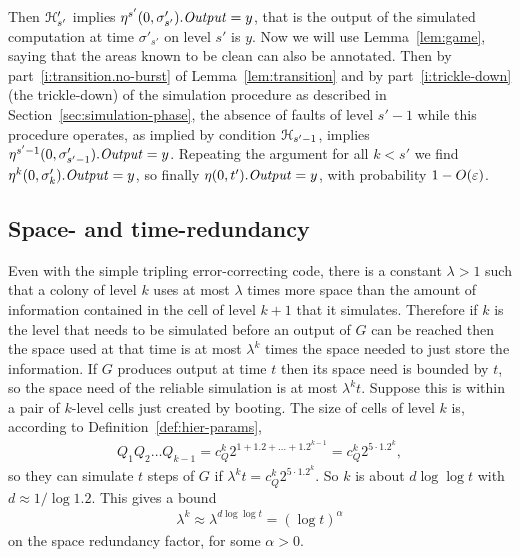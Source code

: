 \documentclass[11pt]{memoir}
\theoremstyle{definition} %
\newcommand{\fld}[1]{\ensuremath{\textit{#1\/}}}
\newcommand{\Q}{Q} %
\newcommand{\Output}{\fld{Output}}
\begin{document}
Then \( \mathcal{H}'_{s'} \) implies   \( \eta^{s'}(0,\sigma'_{s'}).\Output=y \), that is
the output of the simulated computation at time \( \sigma'_{s'} \) on level \( s' \) is \( y \).
Now we will use Lemma~\ref{lem:game}, saying that the areas known to be clean
can also be annotated.
Then by part~\eqref{i:transition.no-burst} of  Lemma~\ref{lem:transition} and
by part~\ref{i:trickle-down} (the trickle-down) of the simulation procedure as described
in Section~\ref{sec:simulation-phase}, the absence of faults of level \( s'-1 \) while this
procedure operates, as implied by condition \( \mathcal{H}_{s'-1} \),
implies \( \eta^{s'-1}(0,\sigma'_{s'-1}).\Output=y \).
Repeating the argument for all \( k<s' \)
we find \( \eta^{k}(0,\sigma'_{k}).\Output=y \),
so finally \( \eta(0,t').\Output=y \), with probability \( 1-O(\varepsilon) \).


 \subsection{Space- and time-redundancy}\label{sec:redundancy}

 Even with the simple tripling error-correcting code, there is a constant \( \lambda>1 \) such that
 a colony of level \( k \) uses at most
 \( \lambda \) times more space than the amount of information contained in the
 cell of level \( k+1 \) that it simulates.
 Therefore if \( k \) is the level that needs to be simulated before an output of \( G \) can be reached
 then the space used at that time is at most \( \lambda^{k} \)
 times the space needed to just store the information.
 If \( G \) produces output at time \( t \) then its space need is bounded by \( t \),
 so the space need of the reliable simulation is at most \( \lambda^{k}t \).
 Suppose this is within a pair of \( k \)-level cells just created by booting.
 The size of cells of level \( k \) is, according to Definition~\ref{def:hier-params},
 \begin{align*}
   \Q_{1}\Q_{2}\dots\Q_{k-1}=c_{\Q}^{k}2^{1 + 1.2 + \dots + 1.2^{k-1}}=c_{\Q}^{k}2^{5\cdot 1.2^{k}},
 \end{align*}
 so they can simulate \( t \) steps of \( G \) if
 \( \lambda^{k}t = c_{\Q}^{k}2^{5\cdot 1.2^{k}} \).
 So \( k \) is about \( d\log\log t \) with \( d\approx 1/\log 1.2 \).
 This gives a bound 
 \begin{align*}
 \lambda^{k}\approx \lambda^{d\log\log t}=(\log t)^{\alpha}  
\end{align*}
on the space redundancy factor, for some \( \alpha>0 \).
\end{document}
